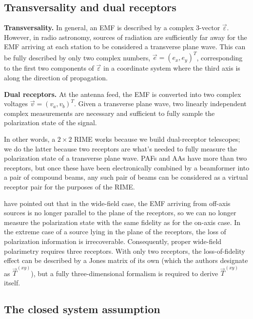 \documentclass[]{aa}
\newcommand{\jones}[2]{\vec {#1}_{#2}}
\begin{document}
\subsection{Transversality and dual receptors}

{\bf Transversality.} In general, an EMF is described by a complex 3-vector $\vec\varepsilon$. However, in radio astronomy, sources of radiation are sufficiently far away for the EMF arriving at each station to be considered a transverse plane wave. This can be fully described by only two complex numbers, $\vec e=(e_x,e_y)^T$, corresponding to the first two components of $\vec\varepsilon$ in a coordinate system where the third axis is along the direction of propagation.

{\bf Dual receptors.} At the antenna feed, the EMF is converted into two complex voltages $\vec v=(v_a,v_b)^T$. Given a transverse plane wave, two linearly independent complex measurements are necessary and sufficient to fully sample the polarization state of the signal. 

In other words, a $2\times2$ RIME works because we build dual-receptor telescopes; we do the latter because two receptors are what's needed to fully measure the polarization state of a transverse plane wave. PAFs and AAs have more than two receptors, but once these have been electronically combined by a beamformer into a pair of compound beams, any such pair of beams can be considered as a virtual receptor pair for the purposes of the RIME.

\citet{Carozzi:ME3D} have pointed out that in the wide-field case, the EMF arriving from off-axis sources is no longer parallel to the plane of the receptors, so we can no longer measure the polarization state with the same fidelity as for the on-axis case. In the extreme case of a source lying in the plane of the receptors, the loss of polarization information is irrecoverable. Consequently, proper wide-field polarimetry requires three receptors. With only two receptors, the loss-of-fidelity effect can be described by a Jones matrix of its own (which the authors designate as $\jones{T}{}^{(xy)}$), but a fully three-dimensional formalism is required to derive $\jones{T}{}^{(xy)}$ itself.

\subsection{The closed system assumption}
\label{sec:closed-sys-assumption}
\end{document}
